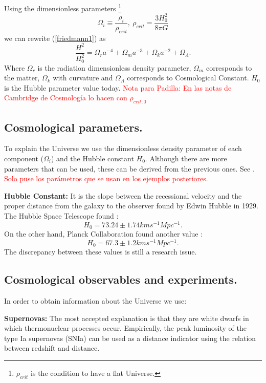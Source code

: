 \documentclass[onecolumn,           %
               showpacs,            %
               preprintnumbers,     %
               aps,                 %
               letterpaper,             %
               superscriptaddress,      %
               nofootinbib,         %
               tightenlines,        %
               floats,floatfix      %
               ,usenatbib,
               ]{revtex4-1}
\begin{document}
Using the dimensionless parameters \footnote{$\rho_{crit}$ is the condition to have a flat Universe.}
\begin{equation}
\Omega_{i} \equiv \frac{\rho_i}{\rho_{crit}}, \ \rho_{crit} = \frac{3H_0^2}{8 \pi G}
\end{equation} 
we can rewrite (\ref{friedmann1}) as
\begin{equation}
\label{friedmann3}
\frac{H^2}{H_0^2} = \Omega_r a^{-4} + \Omega_m a^{-3} + \Omega_k a^{-2} + \Omega_{\Lambda} .
\end{equation}
Where $\Omega_r$ is the radiation dimensionless density parameter, $\Omega_m$ corresponds to the matter, $\Omega_k$ with curvature and $\Omega_{\Lambda}$ corresponds to Cosmological Constant. $H_0$ is the Hubble parameter value today. \textcolor{red}{Nota para Padilla: En las notas de Cambridge de Cosmolog\'ia lo hacen con $\rho_{crit, 0}$}

\subsection{Cosmological parameters.}
To explain the Universe we use the dimensionless density parameter of each component ($\Omega_i$) and the Hubble constant $H_0$. Although there are more parameters that can be used, these can be derived from the previous ones. See \cite{parametros}.
\textcolor{red}{Solo puse los par\'ametros que se usan en los ejemplos posteriores.}

\textbf{Hubble Constant:} It is the slope between the recessional velocity and the proper distance from the galaxy to the observer found by Edwin Hubble in 1929. The Hubble Space Telescope found \cite{hubble2016}:
\begin{equation}
H_0 = 73.24 \pm 1.74 kms^{-1} Mpc^{-1}.
\end{equation}
On the other hand, Planck Collaboration found another value \cite{planck}:
\begin{equation}
H_0 = 67.3 \pm 1.2 kms^{-1} Mpc^{-1}.
\end{equation}
The discrepancy between these values ​​is still a research issue.

\subsection{Cosmological observables and experiments.}
In order to obtain information about the Universe we use:

\textbf{Supernovas:} The most accepted explanation is that they are white dwarfs in which thermonuclear processes occur. Empirically, the peak luminosity of the type Ia supernovas (SNIa) can be used as a distance indicator using the relation between redshift and distance\cite{parametros}. 
\end{document}
